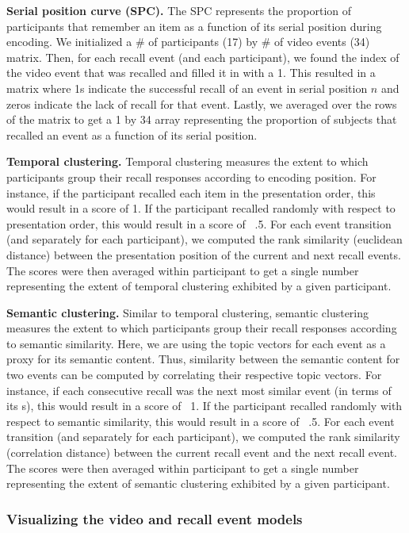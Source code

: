 \documentclass{article}
\begin{document}
{\textbf{Serial position curve (SPC).} The SPC represents the proportion of participants that remember an item as a function of its serial position during encoding. We initialized a \# of participants (17) by \# of video events (34) matrix. Then, for each recall event (and each participant), we found the index of the video event that was recalled and filled it in with a 1. This resulted in a matrix where 1s indicate the successful recall of an event in serial position $n$ and zeros indicate the lack of recall for that event.  Lastly, we averaged over the rows of the matrix to get a 1 by 34 array representing the proportion of subjects that recalled an event as a function of its serial position.

\textbf{Temporal clustering.} Temporal clustering measures the extent to which participants group their recall responses according to encoding position. For instance, if the participant recalled each item in the presentation order, this would result in a score of 1. If the participant recalled randomly with respect to presentation order, this would result in a score of ~.5.  For each event transition (and separately for each participant), we computed the rank similarity (euclidean distance) between the presentation position  of the current and next recall events. The scores were then averaged within participant to get a single number representing the extent of temporal clustering exhibited by a given participant.

\textbf{Semantic clustering.} Similar to temporal clustering, semantic clustering measures the extent to which participants group their recall responses according to semantic similarity. Here, we are using the topic vectors for each event as a proxy for its semantic content. Thus, similarity between the semantic content for two events can be computed by correlating their respective topic vectors.  For instance, if each consecutive recall was the next most similar event (in terms of its s), this would result in a score of ~1. If the participant recalled randomly with respect to semantic similarity, this would result in a score of ~.5.  For each event transition (and separately for each participant), we computed the rank similarity (correlation distance) between the current recall event and the next recall event. The scores were then averaged within participant to get a single number representing the extent of semantic clustering exhibited by a given participant.

\subsubsection{Visualizing the video and recall event models}

}
\end{document}
